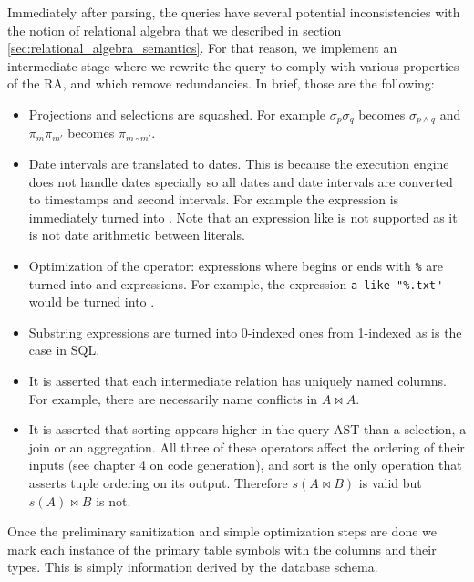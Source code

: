 Immediately after parsing, the queries have several potential
inconsistencies with the notion of relational algebra that we
described in section \ref{sec:relational_algebra_semantics}.
For that reason, we implement an intermediate stage
where we rewrite the query to comply with various properties of the
RA, and which remove redundancies. In brief, those are the following:

\begin{itemize}
\item Projections and selections are squashed. For example
  \(\sigma_p\sigma_q\) becomes \(\sigma_{p \land q}\) and \(\pi_m
  \pi_{m'}\) becomes \(\pi_{m \circ m'}\).
\item Date intervals are translated to dates. This is because the
  execution engine does not handle dates specially so all dates and
  date intervals are converted to timestamps and second intervals. For
  example the expression  is
  immediately turned into . Note that an
  expression like  is not
  supported as it is not date arithmetic between literals.
\item Optimization of the  operator:  expressions where  begins
  or ends with \texttt{\%} are turned into  and
   expressions. For example, the expression \texttt{a
    like "\%.txt"} would be turned into .
\item Substring expressions are turned into 0-indexed ones from
  1-indexed as is the case in SQL.
\item It is asserted that each intermediate relation has uniquely
  named columns. For example, there are necessarily name conflicts in
  \(A \Join A\).
\item It is asserted that sorting appears higher in the query AST than a
  selection, a join or an aggregation. All three of these operators
  affect the ordering of their inputs (see chapter 4 on code
  generation), and sort is the only operation that asserts tuple
  ordering on its output. Therefore \(s(A \Join B)\) is valid but
  \(s(A) \Join B\) is not.
\end{itemize}

Once the preliminary sanitization and simple optimization steps are
done we mark each instance of the primary table symbols with the
columns and their types. This is simply information derived by the
database schema.

